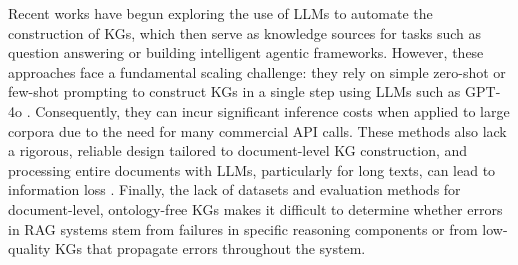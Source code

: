 \documentclass{article} %
\begin{document}
Recent works \citep{edge2024from,gutiérrez2024hipporag} have begun exploring the use of LLMs to automate the construction of KGs, which then serve as knowledge sources for tasks such as question answering or building intelligent agentic frameworks. However, these approaches face a fundamental scaling challenge: they rely on simple zero-shot or few-shot prompting to construct KGs in a single step using LLMs such as GPT-4o \citep{openai2024gpt4o}. Consequently, they can incur significant inference costs when applied to large corpora due to the need for many commercial API calls. These methods also lack a rigorous, reliable design tailored to document-level KG construction, and processing entire documents with LLMs, particularly for long texts, can lead to information loss \citep{edge2024from}. Finally, the lack of datasets and evaluation methods for document-level, ontology-free KGs makes it difficult to determine whether errors in RAG systems stem from failures in specific reasoning components or from low-quality KGs that propagate errors throughout the system.
\end{document}
